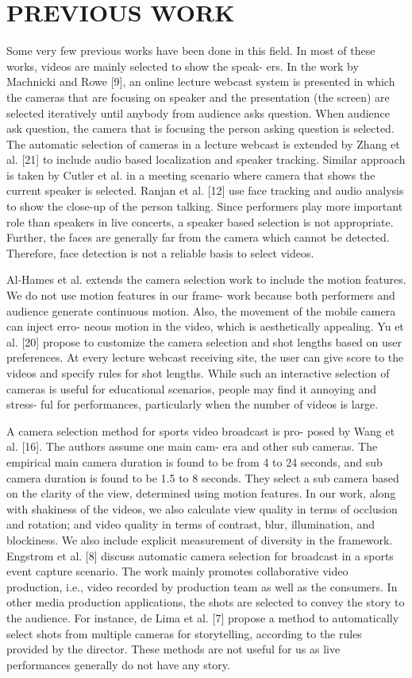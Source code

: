 \documentclass{sig-alternate}
\begin{document}
\section{PREVIOUS WORK}
Some very few previous works have been done in this field. In
most of these works, videos are mainly selected to show the speak-
ers. In the work by Machnicki and Rowe [9], an online lecture
webcast system is presented in which the cameras that are focusing
on speaker and the presentation (the screen) are selected iteratively
until anybody from audience asks question. When audience ask
question, the camera that is focusing the person asking question is
selected. The automatic selection of cameras in a lecture webcast
is extended by Zhang et al. [21] to include audio based localization
and speaker tracking. Similar approach is taken by Cutler et al. \cite{asd:zxc}
in a meeting scenario where camera that shows the current speaker
is selected. Ranjan et al. [12] use face tracking and audio analysis to show the close-up of the person talking. Since performers play more important role than speakers in live concerts, a speaker
based selection is not appropriate. Further, the faces are generally
far from the camera which cannot be detected. Therefore, face detection is not a reliable basis to select videos.

Al-Hames et al. \cite{hames:ml} extends the camera selection work to include
the motion features. We do not use motion features in our frame-
work because both performers and audience generate continuous
motion. Also, the movement of the mobile camera can inject erro-
neous motion in the video, which is aesthetically appealing. Yu et
al. [20] propose to customize the camera selection and shot lengths
based on user preferences. At every lecture webcast receiving site,
the user can give score to the videos and specify rules for shot
lengths. While such an interactive selection of cameras is useful
for educational scenarios, people may find it annoying and stress-
ful for performances, particularly when the number of videos is
large.

A camera selection method for sports video broadcast is pro-
posed by Wang et al. [16]. The authors assume one main cam-
era and other sub cameras. The empirical main camera duration is
found to be from 4 to 24 seconds, and sub camera duration is found
to be 1.5 to 8 seconds. They select a sub camera based on the clarity of the view, determined using motion features. In our work, along with shakiness of the videos, we also calculate view quality in terms of occlusion and rotation; and video quality in terms of contrast, blur, illumination, and blockiness. We also include
explicit measurement of diversity in the framework. Engstrom et
al. [8] discuss automatic camera selection for broadcast in a sports
event capture scenario. The work mainly promotes collaborative
video production, i.e., video recorded by production team as well
as the consumers.
In other media production applications, the shots are selected to
convey the story to the audience. For instance, de Lima et al. [7] propose a method to automatically select shots from multiple cameras for storytelling, according to the rules provided by the director.
These methods are not useful for us as live performances generally
do not have any story.
\end{document}
